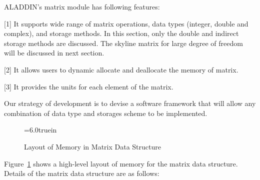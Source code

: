 \vspace{0.15 in}\noindent
ALADDIN's matrix module has following features:

\begin{description}
\item {[1]}
It supports wide range of matrix operations, data types (integer, double and complex),
and storage methods. In this section, only the double and indirect storage methods
are discussed. The skyline matrix for large degree of freedom will be
discussed in next section.
\vspace{0.05 in}
\item {[2]}
It allows users to dynamic allocate and deallocate the memory of matrix.
\vspace{0.05 in}
\item {[3]}
It provides the units for each element of the matrix.
\end{description}

\vspace{0.15 in}\noindent
Our strategy of development is to devise a software framework that will allow
any combination of data type and storages scheme to be implemented.

\begin{figure}[h]
\epsfxsize=6.0truein
\centerline{}
\caption{Layout of Memory in Matrix Data Structure}
\label{fig: my-chapter2-fig1}
\end{figure}

\vspace{0.15 in}\noindent
Figure~\ref{fig: my-chapter2-fig1} shows a high-level layout
of memory for the matrix data structure.
Details of the matrix data structure are as follows:

